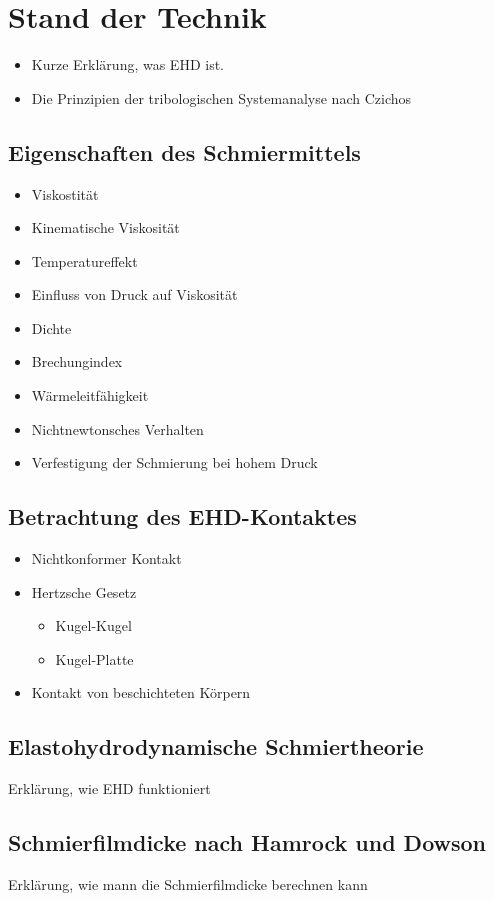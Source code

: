 \chapter{Stand der Technik}
\label{chap:stand_der_technik}
\begin{itemize}
    \item Kurze Erklärung, was EHD ist.
    \item Die Prinzipien der tribologischen Systemanalyse nach Czichos
\end{itemize}

\section{Eigenschaften des Schmiermittels}
\label{sec:eigenschaften_des_schmiermittels}
\begin{itemize}
    \item Viskostität
    \item Kinematische Viskosität
    \item Temperatureffekt
    \item Einfluss von Druck auf Viskosität
    \item Dichte
    \item Brechungindex
    \item Wärmeleitfähigkeit
    \item Nichtnewtonsches Verhalten
    \item Verfestigung der Schmierung bei hohem Druck
\end{itemize}

\section{Betrachtung des EHD-Kontaktes}
\label{sec:betrachtung_des_ehd_kontaktes}
\begin{itemize}
    \item Nichtkonformer Kontakt
    \item Hertzsche Gesetz
        \begin{itemize}
            \item Kugel-Kugel
            \item Kugel-Platte
        \end{itemize}
    \item Kontakt von beschichteten Körpern
\end{itemize}

\section{Elastohydrodynamische Schmiertheorie}
\label{elastohydrodynamische_schmiertheorie}
Erklärung, wie EHD funktioniert

\section{Schmierfilmdicke nach Hamrock und Dowson}
\label{sec:schmierfilmdicke_nach_hamrock_und_dowson}
Erklärung, wie mann die Schmierfilmdicke berechnen kann

